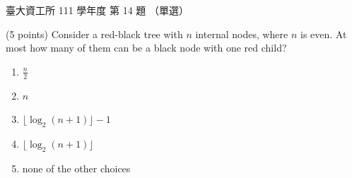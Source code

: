 \begin{pastexam}[label={px:ntu-111-dsaa-14}]{臺大資工所 111 學年度 第 14 題}
（單選）

(5 points) Consider a red-black tree with $n$ internal nodes, where $n$ is even. At most how many
of them can be a black node with one red child?
\begin{enumerate}[label=(\Alph*)]
\item $\frac{n}{2}$
\item $n$
\item $\lfloor\log_2(n+1)\rfloor-1$
\item $\lfloor\log_2(n+1)\rfloor$
\item none of the other choices
\end{enumerate}
\end{pastexam}

